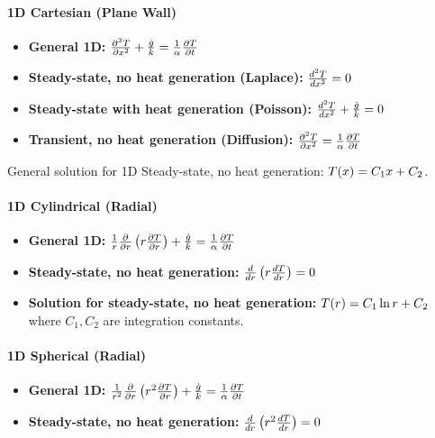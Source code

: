 \paragraph*{1D Cartesian (Plane Wall)}
\begin{itemize}
    \item \textbf{General 1D:} $\frac{\partial^2 T}{\partial x^2} + \frac{\dot{g}}{k} = \frac{1}{\alpha} \frac{\partial T}{\partial t}$
    \item \textbf{Steady-state, no heat generation (Laplace):} $\frac{d^2 T}{d x^2} = 0$
    \item \textbf{Steady-state with heat generation (Poisson):} $\frac{d^2 T}{d x^2} + \frac{\dot{g}}{k} = 0$
    \item \textbf{Transient, no heat generation (Diffusion):} $\frac{\partial^2 T}{\partial x^2} = \frac{1}{\alpha} \frac{\partial T}{\partial t}$
\end{itemize}
General solution for 1D Steady-state, no heat generation: $T(x) = C_1 x + C_2$.

\paragraph*{1D Cylindrical (Radial)}
\begin{itemize}
    \item \textbf{General 1D:} $\frac{1}{r} \frac{\partial}{\partial r}\left(r \frac{\partial T}{\partial r}\right) + \frac{\dot{g}}{k} = \frac{1}{\alpha} \frac{\partial T}{\partial t}$
    \item \textbf{Steady-state, no heat generation:} $\frac{d}{d r}\left(r \frac{d T}{d r}\right) = 0$
    \item \textbf{Solution for steady-state, no heat generation:} $T(r) = C_1 \ln r + C_2$ \\
    \quad where $C_1, C_2$ are integration constants.
\end{itemize}

\paragraph*{1D Spherical (Radial)}
\begin{itemize}
    \item \textbf{General 1D:} $\frac{1}{r^2} \frac{\partial}{\partial r}\left(r^2 \frac{\partial T}{\partial r}\right) + \frac{\dot{g}}{k} = \frac{1}{\alpha} \frac{\partial T}{\partial t}$
    \item \textbf{Steady-state, no heat generation:} $\frac{d}{d r}\left(r^2 \frac{d T}{d r}\right) = 0$
\end{itemize}

